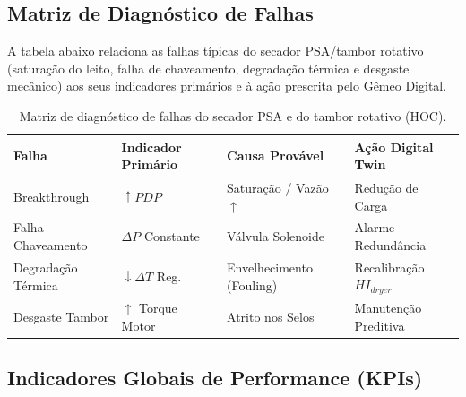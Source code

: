 \documentclass[12pt,a4paper]{article}
\numberwithin{equation}{section}
\numberwithin{table}{section}
\numberwithin{figure}{section}
\begin{document}
		\subsection{\textbf{Matriz de Diagnóstico de Falhas}}
		A tabela abaixo relaciona as falhas típicas do secador PSA/tambor rotativo (saturação do leito, falha de chaveamento, degradação térmica e desgaste mecânico) aos seus indicadores primários e à ação prescrita pelo Gêmeo Digital.
		\begin{table}[h!]
			\centering
			\begin{tabular}{llll}
				\toprule
				\textbf{Falha} & \textbf{Indicador Primário} & \textbf{Causa Provável} & \textbf{Ação Digital Twin} \\ \midrule
				Breakthrough & $\uparrow PDP$ & Saturação / Vazão $\uparrow$ & Redução de Carga \\
				Falha Chaveamento & $\Delta P$ Constante & Válvula Solenoide & Alarme Redundância \\
				Degradação Térmica & $\downarrow \Delta T$ Reg. & Envelhecimento (Fouling) & Recalibração $HI_{dryer}$ \\
				Desgaste Tambor & $\uparrow$ Torque Motor & Atrito nos Selos & Manutenção Preditiva \\ \bottomrule
			\end{tabular}
			\caption{Matriz de diagnóstico de falhas do secador PSA e do tambor rotativo (HOC).}
		\end{table}
		
		\subsection{\textbf{Indicadores Globais de Performance (KPIs)}}
		
\end{document}
